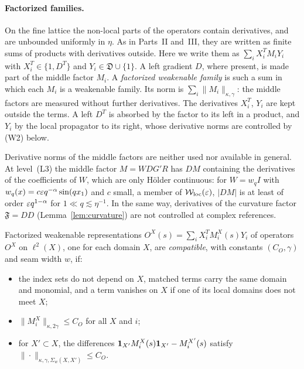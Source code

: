 \paragraph{Factorized families.} On the fine lattice the non-local parts of the operators contain derivatives, and are unbounded uniformly in $\eta$. As in Parts~II and~III, they are written as finite sums of products with derivatives outside. Here we write them as $\sum_iX_i^TM_iY_i$ with $X_i^T\in\{1,D^T\}$ and $Y_i\in\mathfrak D\cup\{1\}$. A left gradient $D$, where present, is made part of the middle factor $M_i$. A \emph{factorized weakenable family} is such a sum in which each $M_i$ is a weakenable family. Its norm is $\sum_i\|M_i\|_{\kappa,\gamma}$: the middle factors are measured without further derivatives. The derivatives $X_i^T$, $Y_i$ are kept outside the terms. A left $D^T$ is absorbed by the factor to its left in a product, and $Y_i$ by the local propagator to its right, whose derivative norms are controlled by (W2) below.

Derivative norms of the middle factors are neither used nor available in general. At level~(L3) the middle factor $M=WDG'R$ has $DM$ containing the derivatives of the coefficients of $W$, which are only H\"older continuous: for $W=w_qI$ with $w_q(x)=c\varepsilon q^{-\alpha}\sin(qx_1)$ and $c$ small, a member of $\mathcal W_{\rm loc}(\varepsilon)$, $|DM|$ is at least of order $\varepsilon q^{1-\alpha}$ for $1\ll q\lesssim\eta^{-1}$. In the same way, derivatives of the curvature factor $\mathfrak F=DD$ (Lemma~\ref{lem:curvature}) are not controlled at complex references.

\begin{definition}\label{def:compatible}
Factorized weakenable representations $O^X(s)=\sum_iX_i^TM^X_i(s)Y_i$ of operators $O^X$ on $\ell^2(X)$, one for each domain $X$, are \emph{compatible}, with constants $(C_O,\gamma)$ and seam width $w$, if:
\begin{itemize}
\item the index sets do not depend on $X$, matched terms carry the same domain and monomial, and a term vanishes on $X$ if one of its local domains does not meet $X$;
\item $\|M^X_i\|_{\kappa,2\gamma}\le C_O$ for all $X$ and $i$;
\item for $X'\subset X$, the differences $\mathbf 1_{X'}M^X_i(s)\mathbf 1_{X'}-M^{X'}_i(s)$ satisfy $\|\cdot\|_{\kappa,\gamma,\Sigma_w(X,X')}\le C_O$.
\end{itemize}
\end{definition}


